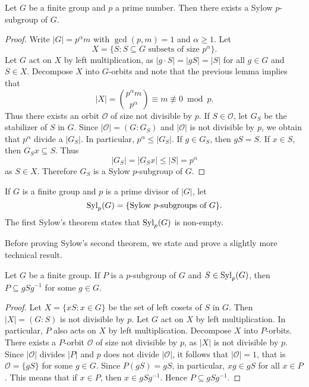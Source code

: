 \begin{theorem}
\label{thm:Sylow1}
Let $G$ be a finite group and 
$p$ a prime number. Then there exists a Sylow $p$-subgroup of $G$. 
\end{theorem}

\begin{proof}
Write $|G|=p^\alpha m$ with $\gcd(p,m)=1$ and $\alpha\geq1$. Let 
\[
X=\{S:S\subseteq G\text{ subsets of size $p^\alpha$}\}.
\]
Let $G$ act on $X$ by left multiplication, as $|g\cdot S|=|gS|=|S|$ for all $g\in G$ and $S\in X$. Decompose $X$
into $G$-orbits and note that the previous lemma
implies that 
\[
|X|= \binom{p^\alpha m}{p^\alpha}\equiv m\not\equiv 0\bmod p.
\]
Thus there exists an orbit $\mathcal{O}$ of size not divisible by $p$. 
If $S\in\mathcal{O}$, let $G_S$ be the stabilizer of $S$ in $G$. Since
$|\mathcal{O}|=(G:G_S)$ and $|\mathcal{O}|$ is not divisible by $p$, we obtain that $p^\alpha$ divide a $|
G_S|$. In particular, $p^\alpha\leq |G_S|$. If $g\in G_S$, then
$gS=S$. If $x\in S$, then $G_Sx\subseteq S$. Thus 
\[
|G_S|=|G_Sx|\leq |S|=p^\alpha
\]
as $S\in X$. Therefore $G_S$ is a Sylow $p$-subgroup of $G$.
\end{proof}

If $G$ is a finite group and
$p$ is a prime divisor of $|G|$, 
let 
\[
\mathrm{Syl}_p(G)=\{\text{Sylow $p$-subgroups of $G$}\}.
\]
The first Sylow's theorem states that 
$\mathrm{Syl}_p(G)$ is non-empty. 

Before proving Sylow's second theorem, 
we state and prove a slightly more technical result. 

\begin{theorem}
\label{thm:Sylow_auxiliar}
Let $G$ be a finite group. 
If $P$ is a $p$-subgroup of $G$ and $S\in\mathrm{Syl}_p(G)$, then $P\subseteq gSg^{-1}$ for some $g\in G$.
\end{theorem}

\begin{proof}
    Let $X=\{xS:x\in G\}$ be the set of left cosets of $S$ in $G$. Then $|X|=(G:S)$ is not divisible by $p$. Let $G$ act on $X$ 
    by left multiplication. In particular, 
    $P$ also acts on $X$ by left multiplication. 
    Decompose $X$ into 
    $P$-orbits. There exists a $P$-orbit $\mathcal{O}$ of size
    not divisible by $p$, as $|X|$ is not divisible by $p$. Since  $|\mathcal{O}|$ divides $|P|$ and $p$ does not divide 
    $|\mathcal{O}|$, it follows that $|\mathcal{O}|=1$,
    that is $\mathcal{O}=\{gS\}$ for some
    $g\in G$. Since $P(gS)=gS$, in particular, $xg\in gS$ 
    for all $x\in P$. This means that if $x\in P$, then 
    $x\in gSg^{-1}$. Hence $P\subseteq gSg^{-1}$.
\end{proof}

